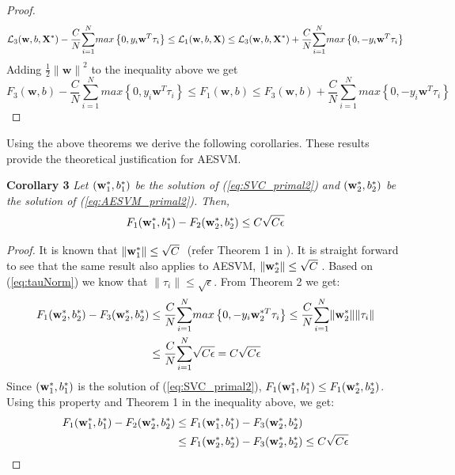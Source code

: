 \documentclass[twoside]{article}
\begin{document}
\begin{proof}
\begin{equation*}
{\cal L}_3({\bf w},b,{\bf X}^*) - \frac{C}{N}\overset{N}{\underset{i = 1}{\sum}}max\left\{0, y_{i}\mathbf{w}^T \tau_i\right\} \le {\cal L}_1({\bf w},b,{\bf X}) \le {\cal L}_3({\bf w},b,{\bf X}^*) + \frac{C}{N}\overset{N}{\underset{i = 1}{\sum}}max\left\{0, -y_{i}\mathbf{w}^T \tau_i\right\}
\end{equation*}
Adding $\frac{1}{2}{\|{\mathbf{w}}\|}^{2}$ to the inequality above we get
\begin{equation*}
F_3 (\mathbf{w}, b)- \frac{C}{N}\overset{N}{\underset{i = 1}{\sum}}max\left\{0, y_{i}\mathbf{w}^T \tau_i\right\} \le F_1 (\mathbf{w}, b) \le F_3 (\mathbf{w}, b) + \frac{C}{N}\overset{N}{\underset{i = 1}{\sum}}max\left\{0, -y_{i}\mathbf{w}^T \tau_i\right\}
\end{equation*}
\end{proof}

Using the above theorems we derive the following corollaries. These results provide the theoretical justification for AESVM.

\noindent
{\bf Corollary 3} {\it Let $({\bf w}_1 ^*, b _1 ^*)$ be the solution of (\ref{eq:SVC_primal2}) and   $({\bf w}_2 ^*, b _2 ^*)$ be the solution of (\ref{eq:AESVM_primal2}). Then,
\begin{equation*}
F_1 ({\bf w}_1 ^*, b _1 ^*) - F_2 ({\bf w}_2 ^*, b _2 ^*) \le C\sqrt{C\epsilon}
\end{equation*}}

\begin{proof}
It is known that $\|{\bf w}_1^*\| \le \sqrt{C}\;$ (refer Theorem 1 in \citet{Shwartz11}). It is straight forward to see that the same result also applies to AESVM, $\|{\bf w}_2^*\| \le \sqrt{C}\;$. Based on (\ref{eq:tauNorm}) we know that $\|\tau_i\| \le \sqrt{\epsilon}$. From Theorem 2 we get:
\begin{align}
F_1 ({\bf w}_2 ^*, b _2 ^*) - F_3 ({\bf w}_2 ^*, b _2 ^*) &\le \frac{C}{N}\overset{N}{\underset{i = 1}{\sum}}max\left\{0, -y_{i}{\bf w}_2 ^{*T} \tau_i\right\} \le \frac{C}{N}\overset{N}{\underset{i = 1}{\sum}} \|{\bf w}_2^*\|\|\tau_i\| \nonumber\\
&\le \frac{C}{N}\overset{N}{\underset{i = 1}{\sum}} \sqrt{C\epsilon} = C\sqrt{C\epsilon} \nonumber
\end{align}
Since $({\bf w}_1 ^*, b _1 ^*)$ is the solution of (\ref{eq:SVC_primal2}), $F_1 ({\bf w}_1 ^*, b _1 ^*) \le F_1 ({\bf w}_2 ^*, b _2 ^*)$. Using this property and Theorem 1 in the inequality above, we get:
\begin{align}
F_1 ({\bf w}_1 ^*, b _1 ^*) - F_2 ({\bf w}_2 ^*, b _2 ^*) &\le F_1 ({\bf w}_1 ^*, b _1 ^*) - F_3 ({\bf w}_2 ^*, b _2 ^*) \nonumber\\
&\le F_1 ({\bf w}_2 ^*, b _2 ^*) - F_3 ({\bf w}_2 ^*, b _2 ^*) \le C\sqrt{C\epsilon} \label{eq:cor2.1}
\end{align}
\end{proof}
\end{document}
